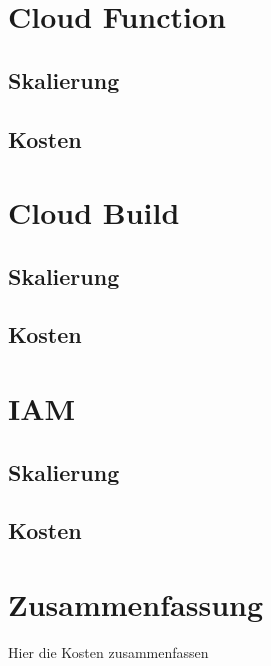 \section{Cloud Function}
\blindtext

\subsection*{Skalierung}
\blindtext

\subsection*{Kosten}
\sblindtext


\section{Cloud Build}
\blindtext

\subsection*{Skalierung}
\blindtext

\subsection*{Kosten}
\sblindtext


\section{IAM}
\blindtext

\subsection*{Skalierung}
\blindtext

\subsection*{Kosten}
\sblindtext



\section{Zusammenfassung}
Hier die Kosten zusammenfassen